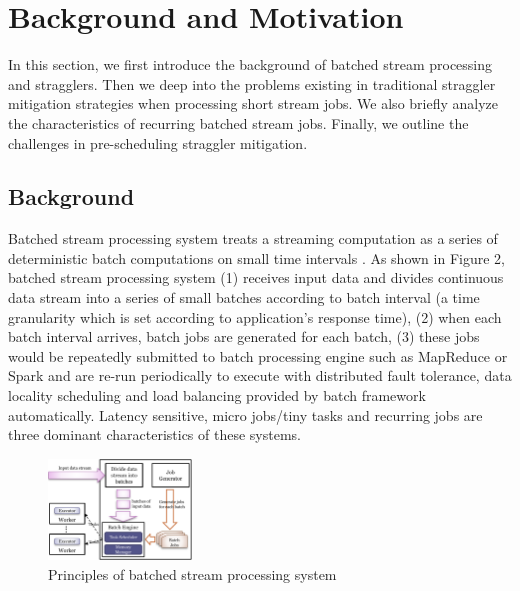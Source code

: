 \section{Background and Motivation}

  In this section, we first introduce the background of batched stream processing and stragglers. Then we deep into the problems existing in traditional straggler mitigation strategies when processing short stream jobs. We also briefly analyze the characteristics of recurring batched stream jobs. Finally, we outline the challenges in pre-scheduling straggler mitigation.

\subsection{Background}

  Batched stream processing system treats a streaming computation as a series of deterministic batch computations on small time intervals \cite{Zaharia2013}. As shown in Figure 2, batched stream processing system (1) receives input data and divides continuous data stream into a series of small batches according to batch interval (a time granularity which is set according to application's response time), (2) when each batch interval arrives, batch jobs are generated for each batch, (3) these jobs would be repeatedly submitted to batch processing engine such as MapReduce or Spark and are re-run periodically to execute with distributed fault tolerance, data locality scheduling and load balancing provided by batch framework automatically. Latency sensitive, micro jobs/tiny tasks and recurring jobs are three dominant characteristics of these systems.
  \begin{figure}[htbp]
    \centering
    \includegraphics[width=0.34\textwidth]{FigureBatchStream}
    \caption{Principles of batched stream processing system}\label{Fig. 2:}
  \end{figure}

